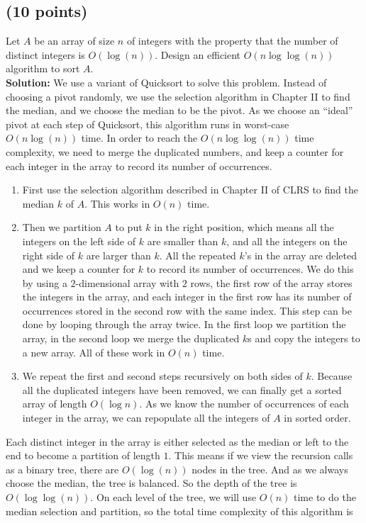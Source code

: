 \documentclass[letterpaper, 11pt]{article}
\begin{document}
\subsection{(10 points)}
Let $A$ be an array of size $n$ of integers with the property that the number of distinct integers is  $O(\log(n))$. Design an efficient $O(n\log\log(n))$ algorithm to sort $A$.\\
\textbf{Solution:} 
We use a variant of Quicksort to solve this problem. Instead of choosing a pivot randomly, we use the selection algorithm in Chapter II to find the median, and we choose the median to be the pivot. As we choose an ``ideal'' pivot at each step of Quicksort, this algorithm runs in worst-case $O(n\log(n))$ time. In order to reach the $O(n\log\log(n))$ time complexity, we need to merge the duplicated numbers, and keep a counter for each integer in the array to record its number of
occurrences. \\
\begin{enumerate}
    \item First use the selection algorithm described in Chapter II of CLRS to find the median $k$ of $A$. This works in $O(n)$ time.
    \item Then we partition $A$ to put $k$ in the right position, which means all the integers on the left side of $k$ are smaller than $k$, and all the integers on the right side of $k$ are larger than $k$. All the repeated $k$'s in the array are deleted and we keep a counter for $k$ to record its number of occurrences. We do this by using a $2$-dimensional array with $2$ rows, the first row of the array stores the integers in the array, and each integer in the first row has its number
        of occurrences stored in the second row with the same index. This step can be done by looping through the array twice. In the first loop we partition the array, in the second loop we merge the duplicated $k$s and copy the
        integers to a new array. All of these work in $O(n)$ time.
    \item We repeat the first and second steps recursively on both sides of $k$. Because all the duplicated integers have been removed, we can finally get a sorted array of length $O(\log{n})$. As we know the number of occurrences of each integer in the array, we can repopulate all the integers of $A$ in sorted order. 
\end{enumerate}
Each distinct integer in the array is either selected as the median or left to the end to become a partition of length $1$. This means if we view the recursion calls as a binary tree, there are $O(\log(n))$ nodes in the tree. And as we always choose the median, the tree is balanced. So the depth of the tree is $O(\log\log(n))$. On each level of the tree, we will use $O(n)$ time to do the median selection and partition, so the total time complexity of this algorithm is
\end{document}
